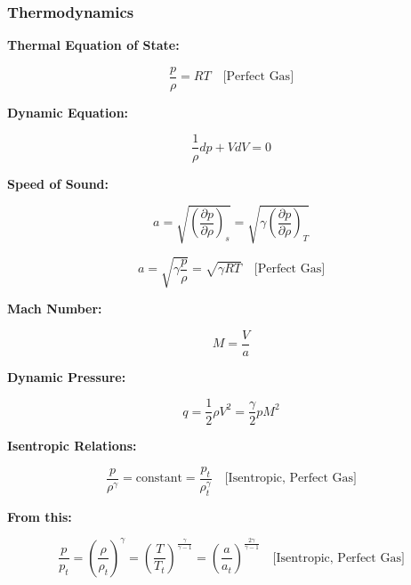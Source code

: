 \subsubsection{Thermodynamics}

\textbf{Thermal Equation of State:}

\begin{equation}
	\frac{p}{\rho} = RT \quad \text{[Perfect Gas]}
\end{equation}

\textbf{Dynamic Equation:}

\begin{equation}
	\frac{1}{\rho} dp + V dV = 0
\end{equation}

\textbf{Speed of Sound:}

\begin{equation}
	a = \sqrt{\left( \frac{\partial p}{\partial \rho} \right)_s} = \sqrt{\gamma \left( \frac{\partial p}{\partial \rho} \right)_T}
\end{equation}

\begin{equation}
	a = \sqrt{\gamma \frac{p}{\rho}} = \sqrt{\gamma RT} \quad \text{[Perfect Gas]}
\end{equation}

\textbf{Mach Number:}

\begin{equation}
	M = \frac{V}{a}
\end{equation}

\textbf{Dynamic Pressure:}

\begin{equation}
	q = \frac{1}{2} \rho V^2 = \frac{\gamma}{2} p M^2
\end{equation}

\textbf{Isentropic Relations:}

\begin{equation}
	\frac{p}{\rho^\gamma} = \text{constant} = \frac{p_t}{\rho_t^\gamma} \quad \text{[Isentropic, Perfect Gas]}
\end{equation}

\textbf{From this:}

\begin{equation}
	\frac{p}{p_t} = \left( \frac{\rho}{\rho_t} \right)^\gamma = \left( \frac{T}{T_t} \right)^{\frac{\gamma}{\gamma - 1}} = \left( \frac{a}{a_t} \right)^{\frac{2\gamma}{\gamma - 1}} \quad \text{[Isentropic, Perfect Gas]}
\end{equation}

